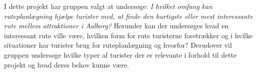 I dette projekt har gruppen valgt at undersøge: \newline \textit{I hvilket omfang kan ruteplanlægning hjælpe turister med, at finde den hurtigste eller mest interessante rute mellem attraktioner i Aalborg?} \newline 
Herunder kan der undersøges hvad en interessant rute ville være, hvilken form for rute turisterne foretrækker og i hvilke situationer har turister brug for ruteplanlægning og hvorfor? Derudover vil gruppen undersøge hvilke typer af turister der er relevante i forhold til dette projekt og hvad deres behov kunne være. \newline 

